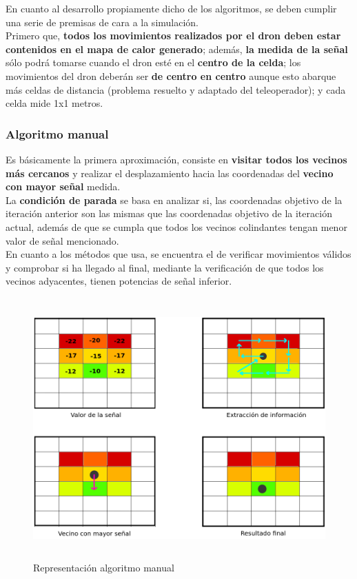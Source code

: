 En cuanto al desarrollo propiamente dicho de los algoritmos, se deben cumplir una serie de premisas de cara a la simulación.\\ 

Primero que, \textbf{todos los movimientos realizados por el dron deben estar contenidos en el mapa de calor generado}; además, \textbf{la medida de la señal} sólo podrá tomarse cuando el dron esté en el \textbf{centro de la celda}; los movimientos del dron deberán ser \textbf{de centro en centro} aunque esto abarque más celdas de distancia (problema resuelto y adaptado del teleoperador); y cada celda mide 1x1 metros.

\subsubsection{Algoritmo manual}
\label{subsec:alg-manual}

Es básicamente la primera aproximación, consiste en \textbf{visitar todos los vecinos más cercanos} y realizar el desplazamiento hacia las coordenadas del \textbf{vecino con mayor señal} medida.\\

La \textbf{condición de parada} se basa en analizar si, las coordenadas objetivo de la iteración anterior son las mismas que las coordenadas objetivo de la iteración actual, además de que se cumpla que todos los vecinos colindantes tengan menor valor de señal mencionado.\\

En cuanto a los métodos que usa, se encuentra el de verificar movimientos válidos y comprobar si ha llegado al final, mediante la verificación de que todos los vecinos adyacentes, tienen potencias de señal inferior.\\

\begin{figure} [H]
    \begin{center}
    \includegraphics[height=10cm]{imagenes/cap4/9_algoritmo_manual.png}
    \end{center}
    \caption[Representación algoritmo manual]{Representación algoritmo manual}
    \label{fig:manual_algorithm}
\end{figure}

